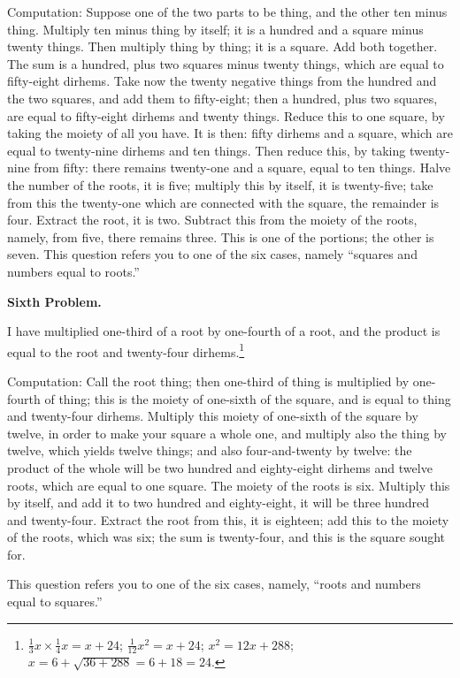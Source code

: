 Computation: Suppose one of the two parts to be thing, and the other ten minus thing. Multiply ten minus thing by itself; it is a hundred and a square minus twenty things. Then multiply thing by thing; it is a square. Add both together. The sum is a hundred, plus two squares minus twenty things, which are equal to fifty-eight dirhems. Take now the twenty negative things from the hundred and the two squares, and add them to fifty-eight; then a hundred, plus two squares, are equal to fifty-eight dirhems and twenty things. Reduce this to one square, by taking the moiety of all you have. It is then: fifty dirhems and a square, which are equal to twenty-nine dirhems and ten things. Then reduce this, by taking twenty-nine from fifty: there remains twenty-one and a square, equal to ten things. Halve the number of the roots, it is five; multiply this by itself, it is twenty-five; take from this the twenty-one which are connected with the square, the remainder is four. Extract the root, it is two. Subtract this from the moiety of the roots, namely, from five, there remains three. This is one of the portions; the other is seven. This question refers you to one of the six cases, namely ``squares and numbers equal to roots.''

\vspace{0.3cm}
\noindent\textbf{Sixth Problem.}

I have multiplied one-third of a root by one-fourth of a root, and the product is equal to the root and twenty-four dirhems.\footnote{$\frac{1}{3}x \times \frac{1}{4}x = x + 24$; $\frac{1}{12}x^2 = x + 24$; $x^2 = 12x + 288$; $x = 6 + \sqrt{36 + 288} = 6 + 18 = 24$.}

Computation: Call the root thing; then one-third of thing is multiplied by one-fourth of thing; this is the moiety of one-sixth of the square, and is equal to thing and twenty-four dirhems. Multiply this moiety of one-sixth of the square by twelve, in order to make your square a whole one, and multiply also the thing by twelve, which yields twelve things; and also four-and-twenty by twelve: the product of the whole will be two hundred and eighty-eight dirhems and twelve roots, which are equal to one square. The moiety of the roots is six. Multiply this by itself, and add it to two hundred and eighty-eight, it will be three hundred and twenty-four. Extract the root from this, it is eighteen; add this to the moiety of the roots, which was six; the sum is twenty-four, and this is the square sought for.

This question refers you to one of the six cases, namely, ``roots and numbers equal to squares.''

